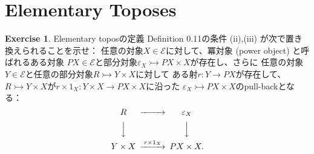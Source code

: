 \documentclass[uplatex]{jsarticle}
\theoremstyle{definition}
\newtheorem{prob}[prob]{Exercise}
\def\ep{\varepsilon}
\newcommand{\rtot}{\rightarrowtail}
\def\mcE{\mathcal{E}}
\begin{document}
\newpage
\renewcommand{\thesection}{Chapter \arabic{section}:}
\section{\protect\quad Elementary Toposes}
\label{section: 1}
\renewcommand{\thesection}{\arabic{section}}


\begin{prob}\label{prob: 1.1}
  Elementary toposの定義 Definition 0.11の条件 (ii),(iii) が次で置き換えられることを示せ：
  任意の対象\(X\in\mcE\)に対して、冪対象 (power object) と呼ばれるある対象
  \(PX\in \mcE\)と部分対象\(\ep_X\rtot PX\times X\)が存在し、さらに
  任意の対象\(Y\in \mcE\)と任意の部分対象\(R\rtot Y\times X\)に対して
  ある射\(r:Y\to PX\)が存在して、
  \(R\rtot Y\times X\)が\(r\times 1_X:Y\times X \to PX\times X\)に沿った
  \(\ep_X \rtot PX\times X\)のpull-backとなる：
  \[
  \begin{CD}
    R @>>> \ep_X \\
    @VVV @VVV \\
    Y\times X @>r\times 1_X>> PX\times X.
  \end{CD}
  \]
\end{prob}
\end{document}
